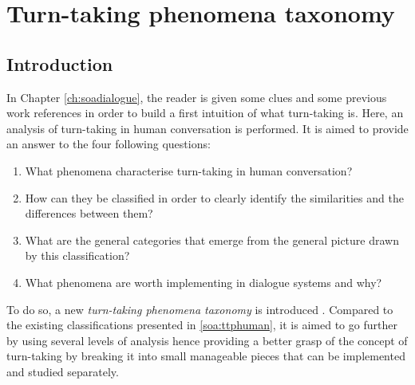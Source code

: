 \chapter{Turn-taking phenomena taxonomy}
\label{ch:taxonomy}

\section{Introduction}
				
				In Chapter \ref{ch:soadialogue}, the reader is given some clues and some previous work references in order to build a first intuition of what turn-taking is. Here, an analysis of turn-taking in human conversation is performed. It is aimed to provide an answer to the four following questions:

        \begin{enumerate}
          \item What phenomena characterise turn-taking in human conversation?
          \item How can they be classified in order to clearly identify the similarities and the differences between them?
          \item What are the general categories that emerge from the general picture drawn by this classification?
          \item What phenomena are worth implementing in dialogue systems and why?
        \end{enumerate}
				
				To do so, a new \textit{turn-taking phenomena taxonomy} is introduced \cite{Khouzaimi2015c}. Compared to the existing classifications presented in \ref{soa:ttphuman}, it is aimed to go further by using several levels of analysis hence providing a better grasp of the concept of turn-taking by breaking it into small manageable pieces that can be implemented and studied separately.

